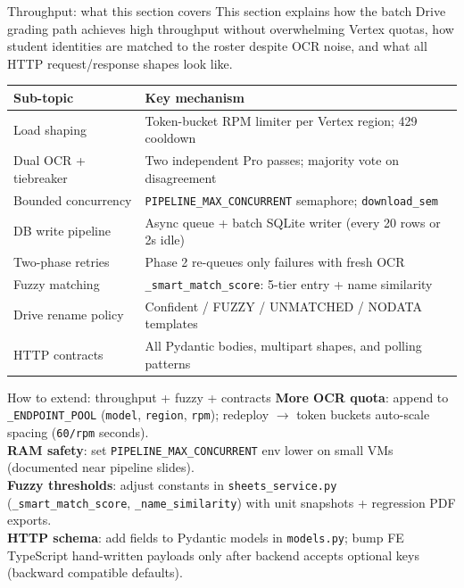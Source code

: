 \documentclass[aspectratio=169]{beamer}
\begin{document}
\begin{frame}{Throughput: what this section covers}
  \small
  This section explains how the batch Drive grading path achieves high throughput
  without overwhelming Vertex quotas, how student identities are matched to the roster
  despite OCR noise, and what all HTTP request/response shapes look like.\\[0.4em]
  \begin{tabular}{@{}p{3.8cm}p{9.9cm}@{}}
    \toprule
    Sub-topic & Key mechanism \\
    \midrule
    Load shaping & Token-bucket RPM limiter per Vertex region; 429 cooldown \\
    Dual OCR + tiebreaker & Two independent Pro passes; majority vote on disagreement \\
    Bounded concurrency & \texttt{PIPELINE\_MAX\_CONCURRENT} semaphore; \texttt{download\_sem} \\
    DB write pipeline & Async queue + batch SQLite writer (every 20 rows or 2s idle) \\
    Two-phase retries & Phase 2 re-queues only failures with fresh OCR \\
    Fuzzy matching & \texttt{\_smart\_match\_score}: 5-tier entry + name similarity \\
    Drive rename policy & Confident / FUZZY / UNMATCHED / NODATA templates \\
    HTTP contracts & All Pydantic bodies, multipart shapes, and polling patterns \\
    \bottomrule
  \end{tabular}
\end{frame}

\begin{frame}{How to extend: throughput + fuzzy + contracts}
  \small
  \textbf{More OCR quota}: append to \texttt{\_ENDPOINT\_POOL} (\texttt{model}, \texttt{region}, \texttt{rpm}); redeploy $\rightarrow$ token buckets auto-scale spacing (\texttt{60/rpm} seconds).\\
  \textbf{RAM safety}: set \texttt{PIPELINE\_MAX\_CONCURRENT} env lower on small VMs (documented near pipeline slides).\\
  \textbf{Fuzzy thresholds}: adjust constants in \texttt{sheets\_service.py} (\texttt{\_smart\_match\_score}, \texttt{\_name\_similarity}) with unit snapshots + regression PDF exports.\\
  \textbf{HTTP schema}: add fields to Pydantic models in \texttt{models.py}; bump FE TypeScript hand-written payloads only after backend accepts optional keys (backward compatible defaults).
\end{frame}
\end{document}
